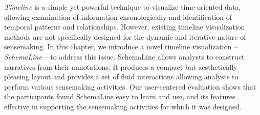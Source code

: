 \emph{Timeline} is a simple yet powerful technique to visualize time-oriented data, allowing examination of information chronologically and identification of temporal patterns and relationships. However, existing timeline visualization methods are not specifically designed for the dynamic and iterative nature of sensemaking. In this chapter, we introduce a novel timeline visualization -- \emph{SchemaLine} -- to address this issue. SchemaLine allows analysts to construct narratives from their annotations. It produces a compact but aesthetically pleasing layout and provides a set of fluid interactions allowing analysts to perform various sensemaking activities. Our user-centered evaluation shows that the participants found SchemaLine easy to learn and use, and its features effective in supporting the sensemaking activities for which it was designed.






